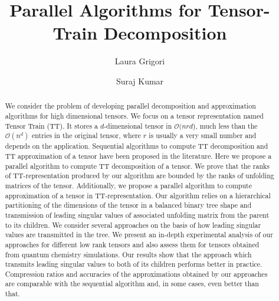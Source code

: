 \documentclass[runningheads]{llncs}
\begin{document}
%
\title{Parallel Algorithms for Tensor-Train Decomposition}
\author{Laura Grigori \and
Suraj Kumar}
\maketitle       %

\begin{abstract}
We consider the problem of developing parallel decomposition and approximation 
algorithms for high dimensional tensors. We focus on a tensor representation 
named Tensor Train (TT). It stores a $d$-dimensional tensor in 
$\mathcal{O}(nrd$), much less than the $\mathcal{O}(n^d)$ entries in the 
original tensor, where $r$ is usually a very small number and depends on the 
application. Sequential algorithms to compute TT decomposition and 
TT approximation of a tensor have been proposed in the literature. Here we 
propose a parallel algorithm to compute TT decomposition of a tensor. We prove 
that the ranks of TT-representation produced by our algorithm are 
bounded by the ranks of unfolding matrices of the tensor. Additionally, we 
propose a parallel algorithm to compute approximation of a tensor in 
TT-representation. Our algorithm relies on a hierarchical partitioning of the 
dimensions of the tensor in a balanced binary tree shape and transmission 
of leading singular values of associated unfolding matrix from the parent to 
its children. We consider several approaches on the basis of 
how leading singular 
values are transmitted in the tree. We present an in-depth experimental 
analysis of our approaches for different low rank tensors and also assess them 
for tensors 
obtained from quantum chemistry simulations. Our results show that the approach 
which transmits leading singular values to both of its children performs better 
in practice. Compression ratios and accuracies of the approximations obtained 
by our approaches are comparable with the sequential algorithm and, in some 
cases, even better than that.

\end{abstract}
\end{document}
